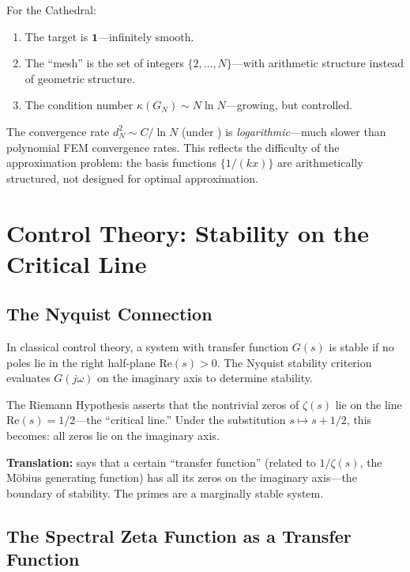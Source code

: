 \documentclass[11pt,a4paper]{article}
\begin{document}
For the Cathedral:
\begin{enumerate}
  \item The target is $\mathbf{1}$---infinitely smooth.
  \item The ``mesh'' is the set of integers $\{2, \ldots, N\}$---with
    arithmetic structure instead of geometric structure.
  \item The condition number $\kappa(G_N) \sim N \ln N$---growing,
    but controlled.
\end{enumerate}

The convergence rate $d_N^2 \sim C / \ln N$ (under \RH) is
\emph{logarithmic}---much slower than polynomial FEM convergence
rates. This reflects the difficulty of the approximation problem:
the basis functions $\{1/(kx)\}$ are arithmetically structured, not
designed for optimal approximation.

\section{Control Theory: Stability on the Critical Line}
\label{sec:control}

\subsection{The Nyquist Connection}

In classical control theory, a system with transfer function $G(s)$
is stable if no poles lie in the right half-plane $\mathrm{Re}(s) > 0$.
The Nyquist stability criterion evaluates $G(j\omega)$ on the
imaginary axis to determine stability.

The Riemann Hypothesis asserts that the nontrivial zeros of
$\zeta(s)$ lie on the line $\mathrm{Re}(s) = 1/2$---the ``critical
line.'' Under the substitution $s \mapsto s + 1/2$, this becomes:
all zeros lie on the imaginary axis.

\textbf{Translation:} \RH{} says that a certain ``transfer function''
(related to $1/\zeta(s)$, the M\"obius generating function) has all
its zeros on the imaginary axis---the boundary of stability. The
primes are a marginally stable system.

\subsection{The Spectral Zeta Function as a Transfer Function}
\end{document}
